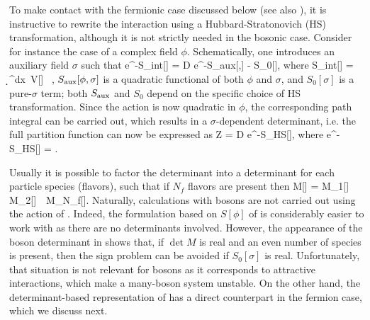 \documentclass[../main.tex]{subfiles}
\begin{document}
To make contact with the fermionic case discussed below (see also ), it is instructive to rewrite the interaction using a Hubbard-Stratonovich (HS) transformation, although it is not strictly needed in the bosonic case. Consider for instance the case of a complex field $\phi$. Schematically, one introduces
an auxiliary field $\sigma$ such that
%
\beq
{\rm e}^{-S_{\rm int}[\phi]} =  \int \mathcal D \sigma\;  {\rm e}^{-S_{\rm aux}[\phi,\sigma] - S_{0}[\sigma]},
\eeq
%
where
%
\beq
S_{\rm int}[\phi] = \int \d\tau \d^dx\ V[\phi] \, ,
\eeq
%
$S_{\rm aux}[\phi,\sigma]$ is a quadratic functional of both $\phi$ and $\sigma$, and $S_{0}[\sigma]$ is a pure-$\sigma$ term; both $S_{\rm aux}$ and $S_{0}$ depend on the specific
choice of HS transformation. Since the action is now quadratic in $\phi$, the corresponding path integral can be carried out, which results in a $\sigma$-dependent determinant, i.e. the full partition function can now be expressed as
%
\beq
\label{Eq:PartitionZ}
\mathcal Z = \int \mathcal D \sigma \;  {\rm e}^{-S_{\rm HS}[\sigma]},
\eeq
%
where
%
\beq
\label{Eq:SHSBosonDeterminant}
{\rm e}^{-S_{\rm HS}[\sigma]} = .
\eeq
%

Usually it is possible to factor the determinant into a determinant for each particle species (flavors), such that if $N_f$ flavors are present then
%
\beq
\label{Eq:BosonDeterminant}
\det M[\sigma] = \det M_1[\sigma] \det M_2[\sigma]\, \cdots\, \det M_{N_f}[\sigma].
\eeq
%
%
Naturally, calculations with bosons are not carried out using the action of .
Indeed, the formulation based on $S[\phi]$ of  is considerably easier to work with as
there are no determinants involved. However, the appearance of the boson determinant in 
shows that, if $\det M$ is real and an even number of species is present, then the sign problem can be avoided if $S_{0}[\sigma]$ is real.
Unfortunately, that situation is not relevant for bosons as it corresponds to attractive interactions, which make a many-boson system unstable.
On the other hand, the determinant-based representation of  has a direct counterpart in the fermion case,
which we discuss next.
\end{document}
